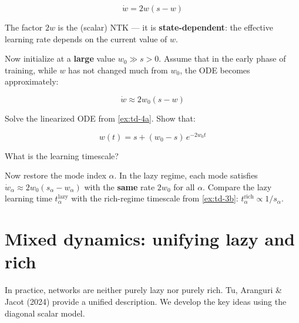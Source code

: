 \documentclass[11pt]{article}
\begin{document}
\[\dot{w} = 2w(s - w)\]

The factor \(2w\) is the (scalar) NTK --- it is
\textbf{state-dependent}: the effective learning rate depends on the
current value of \(w\).

\begin{exercise}
\label{ex:td-4a}
Now initialize at a \textbf{large} value \(w_0 \gg s > 0\). Assume that in
the early phase of training, while \(w\) has not changed much from
\(w_0\), the ODE becomes approximately:

\[\dot{w} \approx 2w_0(s - w)\]
\end{exercise}


\begin{exercise}
\label{ex:td-4b}
Solve the linearized ODE from \cref{ex:td-4a}. Show that:

\[w(t) = s + (w_0 - s)\,e^{-2w_0 t}\]

What is the learning timescale?
\end{exercise}


\begin{exercise}
\label{ex:td-4c}
Now restore the mode
index \(\alpha\). In the lazy regime, each mode satisfies
\(\dot{w}_\alpha \approx 2w_0(s_\alpha - w_\alpha)\) with the
\textbf{same} rate \(2w_0\) for all \(\alpha\). Compare the lazy
learning time \(t_\alpha^{\text{lazy}}\) with the rich-regime timescale
from \cref{ex:td-3b}: \(t_\alpha^{\text{rich}} \propto 1/s_\alpha\).
\end{exercise}


\section{Mixed dynamics: unifying lazy and rich}
\label{sec:td-mixed}

In practice, networks are neither purely lazy nor purely rich. Tu,
Aranguri \& Jacot (2024) provide a unified description. We develop the
key ideas using the diagonal scalar model.
\end{document}
